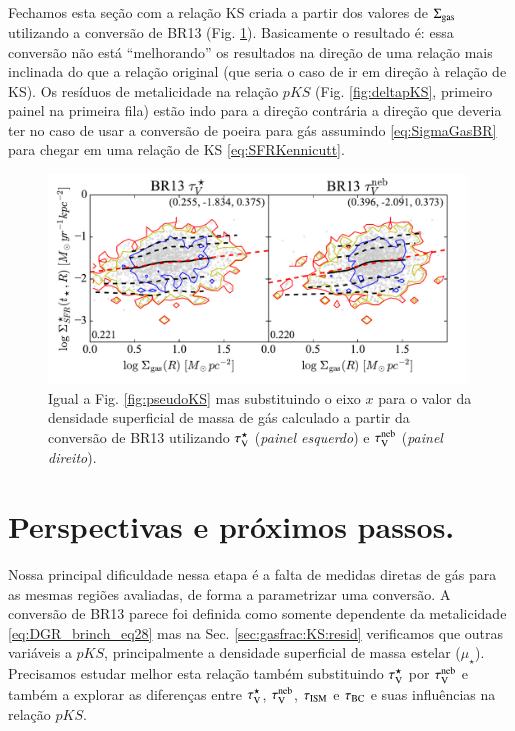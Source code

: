 Fechamos esta seção com a relação KS criada a partir dos valores de $\Sigma_{\mathrm{gas}}$ utilizando a
conversão de BR13 (Fig. \ref{fig:KS}). Basicamente o resultado é: essa conversão não está
``melhorando'' os resultados na direção de uma relação mais inclinada do que a relação original
(que seria o caso de ir em direção à relação de KS). Os resíduos de metalicidade na relação $pKS$
(Fig. \ref{fig:deltapKS}, primeiro painel na primeira fila) estão indo para a direção contrária a
direção que deveria ter no caso de usar a conversão de poeira para gás assumindo
\eqref{eq:SigmaGasBR} para chegar em uma relação de KS \eqref{eq:SFRKennicutt}.

\begin{figure}
	\centering
	\includegraphics[width=0.99\textwidth]{figuras/KS.pdf}
	\caption[Relação de Kennicut-Schmidt.]
	{Igual a Fig. \ref{fig:pseudoKS} mas substituindo o eixo $x$ para o valor da densidade superficial
de massa de gás calculado a partir da conversão de BR13 utilizando $\tau_{\mathrm{V}}^\star$ ({\em painel esquerdo})
e $\tau_{\mathrm{V}}^{\mathrm{neb}}$ ({\em painel direito}).}
	\label{fig:KS}
\end{figure}

\section{Perspectivas e próximos passos.}
\label{sec:gasfrac:nextsteps}

Nossa principal dificuldade nessa etapa é a falta de medidas diretas de gás para as mesmas regiões
avaliadas, de forma a parametrizar uma conversão. A conversão de BR13 parece foi definida como
somente dependente da metalicidade \eqref{eq:DGR_brinch_eq28} mas na Sec. \ref{sec:gasfrac:KS:resid}
verificamos que outras variáveis a $pKS$, principalmente a densidade superficial de massa estelar
($\mu_\star$). Precisamos estudar melhor esta relação também substituindo $\tau_{\mathrm{V}}^\star$ por $\tau_{\mathrm{V}}^{\mathrm{neb}}$ e
também a explorar as diferenças entre $\tau_{\mathrm{V}}^\star$, $\tau_{\mathrm{V}}^{\mathrm{neb}}$, $\tau_{\mathrm{ISM}}$ e $\tau_{\mathrm{BC}}$ e suas influências na
relação $pKS$. 

